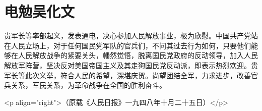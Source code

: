 \section[电勉吴化文（一九四八年十月二十二日）]{电勉吴化文}


贵军长等率部起义，发表通电，决心参加人民解放事业，极为欣慰。中国共产党站在人民立场上，对于任何国民党军队的官兵们，不问其过去行为如何，只要他们能够在人民解放战争的紧要关头，幡然觉悟，脱离国民党政府的反动领导，加入人民解放军阵营，坚决反对美国帝国主义及其走狗国民党反动派，即表示热烈欢迎。贵军长等此次义举，符合人民的希望，深堪庆贺。尚望团结全军，力求进步，改善官兵关系，军民关系，为革命战争在全国的胜利奋斗。

<p align="right">（原载《人民日报》一九四八年十月二十五日）</p>

